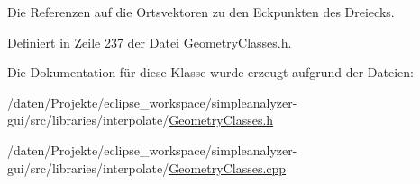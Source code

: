 Die Referenzen auf die Ortsvektoren zu den Eckpunkten des Dreiecks. 



Definiert in Zeile 237 der Datei Geometry\-Classes.\-h.



Die Dokumentation für diese Klasse wurde erzeugt aufgrund der Dateien\-:\begin{DoxyCompactItemize}
\item 
/daten/\-Projekte/eclipse\-\_\-workspace/simpleanalyzer-\/gui/src/libraries/interpolate/\hyperlink{GeometryClasses_8h}{Geometry\-Classes.\-h}\item 
/daten/\-Projekte/eclipse\-\_\-workspace/simpleanalyzer-\/gui/src/libraries/interpolate/\hyperlink{GeometryClasses_8cpp}{Geometry\-Classes.\-cpp}\end{DoxyCompactItemize}
